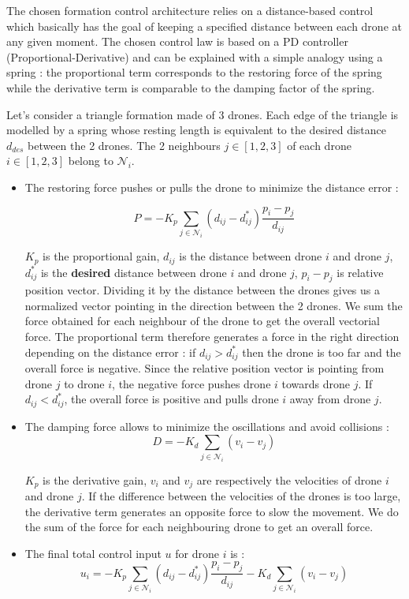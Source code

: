 \documentclass[conference]{IEEEtran}
\begin{document}
The chosen formation control architecture relies on a distance-based control which basically has the goal of keeping a specified distance between each drone at any given moment. The chosen control law is based on a PD controller (Proportional-Derivative) and can be explained with a simple analogy using a spring : the proportional term corresponds to the restoring force of the spring while the derivative term is comparable to the damping factor of the spring.

Let's consider a triangle formation made of 3 drones. Each edge of the triangle is modelled by a spring whose resting length is equivalent to the desired distance $d_{des}$ between the 2 drones. The 2 neighbours $j\in[1,2,3]$ of each drone $i\in[1,2,3]$ belong to $\mathcal{N}_i$.

\begin{itemize}
    \item The restoring force pushes or pulls the drone to minimize the distance error :

    \begin{equation}
       P=-K_p\sum_{j\in \mathcal{N}_i}(d_{ij}-d^\ast _{ij})\frac{p_i-p_j}{d_{ij}}
    \end{equation}
    

    $K_p$ is the proportional gain, $d_{ij}$ is the distance between drone $i$ and drone $j$, $d^\ast_{ij}$ is the \textbf{desired} distance between drone $i$ and drone $j$, $p_i-p_j$ is relative position vector. Dividing it by the distance between the drones gives us a normalized vector pointing in the direction between the 2 drones. We sum the force obtained for each neighbour of the drone to get the overall vectorial force. The proportional term therefore generates a force in the right direction depending on the distance error : if $d_{ij}>d^\ast _{ij}$ then the drone is too far and the overall force is negative. Since the relative position vector is pointing from drone  $j$ to drone $i$, the negative force pushes drone $i$ towards drone $j$. If $d_{ij}<d^\ast _{ij}$, the overall force is positive and pulls drone $i$ away from drone $j$.

    
    \item The damping force allows to minimize the oscillations and avoid collisions :
    \begin{equation}
        D=-K_d\sum_{j\in \mathcal{N}_i}(v_i-v_j)
    \end{equation}
    

    $K_p$ is the derivative gain, $v_{i}$ and $v_j$ are respectively the velocities of drone $i$ and drone $j$. If the difference between the velocities of the drones is too large, the derivative term generates an opposite force to slow the movement. We do the sum of the force for each neighbouring drone to get an overall force.

    \item The final total control input $u$ for drone $i$ is : 
    \begin{equation}
          u_i=-K_p\sum_{j\in \mathcal{N}_i}(d_{ij}-d^\ast _{ij})\frac{p_i-p_j}{d_{ij}}-K_d\sum_{j\in \mathcal{N}_i}(v_i-v_j)
    \end{equation}
  
\end{itemize}
\end{document}
